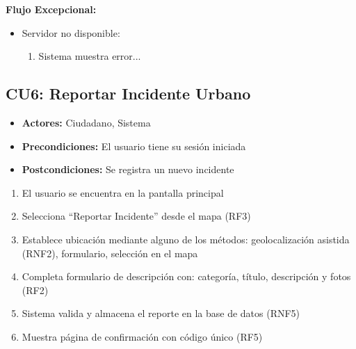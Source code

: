 \begin{multicols}{2}
\textbf{Flujo Excepcional:}
\begin{itemize}
    \item Servidor no disponible:
    \begin{enumerate}
        \item Sistema muestra error...
    \end{enumerate}
\end{itemize}

\subsection*{CU6: Reportar Incidente Urbano}
\begin{itemize}
    \item \textbf{Actores:} Ciudadano, Sistema
    \item \textbf{Precondiciones:} El usuario tiene su sesión iniciada
    \item \textbf{Postcondiciones:} Se registra un nuevo incidente
\end{itemize}
\begin{enumerate}
    \item El usuario se encuentra en la pantalla principal
    \item Selecciona ``Reportar Incidente'' desde el mapa (RF3)
    \item Establece ubicación mediante alguno de los métodos: geolocalización asistida (RNF2), formulario, selección en el mapa
    \item Completa formulario de descripción con: categoría, título, descripción y fotos (RF2)
    \item Sistema valida y almacena el reporte en la base de datos (RNF5)
    \item Muestra página de confirmación con código único (RF5)
\end{enumerate}


\end{multicols}
